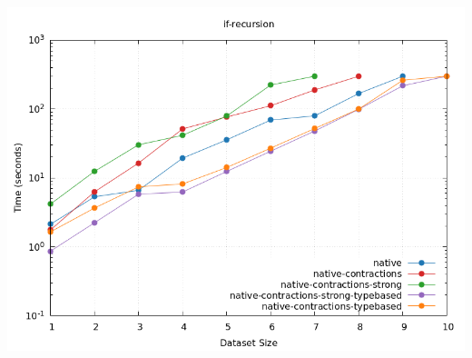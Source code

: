 \documentclass{beamer}
\begin{document}
\begin{frame}
\begin{columns}
  \includegraphics[width=\textwidth]{native_ifrec.png}
\end{columns}
\end{frame}
\end{document}
